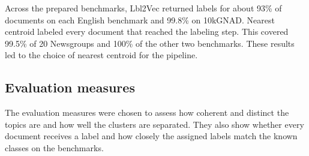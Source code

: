 \measured{} Across the prepared benchmarks, Lbl2Vec returned labels for about 93\% of documents
on each English benchmark and 99.8\% on 10kGNAD. Nearest centroid labeled every document that
reached the labeling step. This covered 99.5\% of 20 Newsgroups and 100\% of the other two
benchmarks. These results led to the choice of nearest centroid for the pipeline.

\subsection{Evaluation measures}
\label{sec:method-metrics}

The evaluation measures were chosen to assess how coherent and distinct the topics are and
how well the clusters are separated. They also show whether every document receives a label
and how closely the assigned labels match the known classes on the benchmarks.

